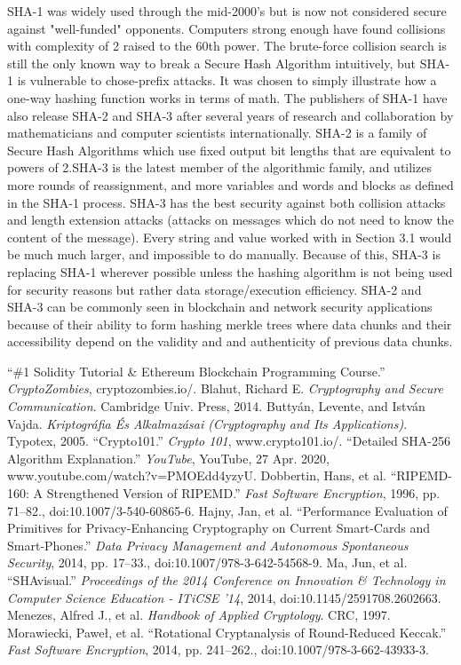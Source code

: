 \documentclass[12pt]{extarticle}
\begin{document}
SHA-1 was widely used through the mid-2000's but is now not considered secure against "well-funded" opponents. Computers strong enough have found collisions with complexity of 2 raised to the 60th power. The brute-force collision search is still the only known way to break a Secure Hash Algorithm intuitively, but SHA-1 is vulnerable to chose-prefix attacks. It was chosen to simply illustrate how a one-way hashing function works in terms of math. The publishers of SHA-1 have also release SHA-2 and SHA-3 after several years of research and collaboration by mathematicians and computer scientists internationally. SHA-2 is a family of Secure Hash Algorithms which use fixed output bit lengths that are equivalent to powers of 2.SHA-3 is the latest member of the algorithmic family, and utilizes more rounds of reassignment, and more variables and words and blocks as defined in the SHA-1 process. SHA-3 has the best security against both collision attacks and length extension attacks (attacks on messages which do not need to know the content of the message). Every string and value worked with in Section 3.1 would be much much larger, and impossible to do manually. Because of this, SHA-3 is replacing SHA-1 wherever possible unless the hashing algorithm is not being used for security reasons but rather data storage/execution efficiency. SHA-2 and SHA-3 can be commonly seen in blockchain and network security applications because of their ability to form hashing merkle trees where data chunks and their accessibility depend on the validity and and authenticity of previous data chunks.\cite{src5}\cite{src8}\cite{src10}

\pagebreak
\begin{thebibliography}{}
“\#1 Solidity Tutorial & Ethereum Blockchain Programming Course.” \textit{CryptoZombies}, cryptozombies.io/. 
Blahut, Richard E. \textit{Cryptography and Secure Communication}. Cambridge Univ. Press, 2014. 
Buttyán, Levente, and István Vajda. \textit{Kriptográfia És Alkalmazásai (Cryptography and Its Applications)}. Typotex, 2005. 
“Crypto101.” \textit{Crypto 101}, www.crypto101.io/. 
“Detailed SHA-256 Algorithm Explanation.” \textit{YouTube}, YouTube, 27 Apr. 2020, www.youtube.com/watch?v=PMOEdd4yzyU. 
Dobbertin, Hans, et al. “RIPEMD-160: A Strengthened Version of RIPEMD.” \textit{Fast Software Encryption}, 1996, pp. 71–82., doi:10.1007/3-540-60865-6. 
Hajny, Jan, et al. “Performance Evaluation of Primitives for Privacy-Enhancing Cryptography on Current Smart-Cards and Smart-Phones.” \textit{Data Privacy Management and Autonomous Spontaneous Security}, 2014, pp. 17–33.,
doi:10.1007/978-3-642-54568-9. 
Ma, Jun, et al. “SHAvisual.” \textit{Proceedings of the 2014 Conference on Innovation & Technology in Computer Science Education - ITiCSE '14}, 2014, doi:10.1145/2591708.2602663. 
Menezes, Alfred J., et al. \textit{Handbook of Applied Cryptology}. CRC, 1997. 
Morawiecki, Paweł, et al. “Rotational Cryptanalysis of Round-Reduced Keccak.” \textit{Fast Software Encryption}, 2014, pp. 241–262., doi:10.1007/978-3-662-43933-3. 
\end{thebibliography}
\end{document}
